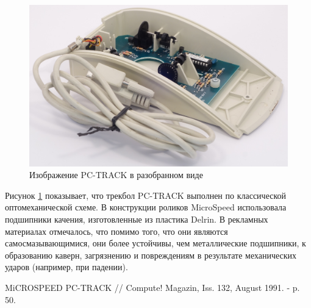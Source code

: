 \documentclass[11pt, a4paper]{article}
\begin{document}
\begin{figure}[h]
    \centering
    \includegraphics[scale=0.6]{1991_microspeed_pc-track/sony1.jpg}
    \caption{Изображение PC-TRACK в разобранном виде}
    \label{fig:PCTRACKInside}
    \end{figure}

Рисунок \ref{fig:PCTRACKInside} показывает, что трекбол PC-TRACK выполнен по классической оптомеханической схеме. В конструкции роликов MicroSpeed использовала подшипники качения, изготовленные из пластика Delrin. В рекламных материалах отмечалось, что помимо того, что они являются самосмазывающимися, они более устойчивы, чем металлические подшипники, к образованию каверн, загрязнению и повреждениям в результате механических ударов (например, при падении).

\begin{thebibliography}{9}
 MiCROSPEED PC-TRACK // Compute! Magazin,  Iss. 132, August 1991. - p. 50.
\end{thebibliography}
\end{document}
